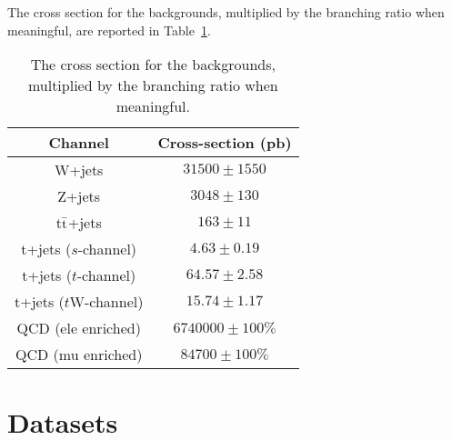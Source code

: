 The cross section for the backgrounds, multiplied by the branching ratio when meaningful, 
are reported in Table~\ref{tab:bkg_XS}. 
\begin{table}[htbp!]
  \begin{center}
  \begin{tabular}{c|c}
  \hline  \hline
  Channel & Cross-section (pb) \\
  \hline
  W+jets                        & $31500 \pm 1550 $ \\
  Z+jets                        & $3048 \pm 130$ \\
  t$\bar{\textnormal{t}}$+jets  & $163 \pm 11$ \\
  t+jets ($s$-channel)          & $4.63 \pm 0.19$ \\
  t+jets ($t$-channel)          & $64.57 \pm 2.58$\\
  t+jets ($t$W-channel)         & $15.74 \pm 1.17$ \\
  QCD (ele enriched)            & $6740000 \pm 100\%$\\
  QCD (mu enriched)             & $84700 \pm  100\%$\\
  \hline  \hline
  \end{tabular}
  \end{center}
  \caption{The cross section for the backgrounds, multiplied by the branching ratio when meaningful.}
  \label{tab:bkg_XS}
\end{table}%
\section{Datasets}
\label{sec:technicalities}

